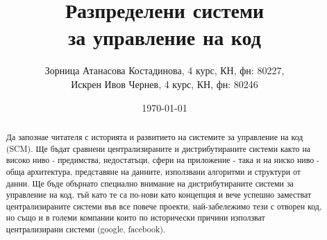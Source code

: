 \documentclass[a4paper]{article}
\begin{document}
\title{
Разпределени системи \\
за управление на код
}
\author{
Зорница Атанасова Костадинова, 4 курс, КН, фн: 80227, \\
Искрен Ивов Чернев, 4 курс, КН, фн: 80246
}
\date{\today}
\maketitle

\begin{abstract}
Да запознае читателя с историята и развитието на системите за управление на код
(SCM). Ще бъдат сравнени централизираните и дистрибутираните системи както на
високо ниво - предимства, недостатъци, сфери на приложение - така и на ниско
ниво - обща архитектура, представяне на данните, използвани алгоритми
и структури от данни. Ще бъде обърнато специално внимание на дистрибутираните
системи за управление на код, тъй като те са по-нови като концепция и вече
успешно заместват централизираните системи във все повече проекти,
най-забележимо тези с отворен код, но също и в големи компании които по
исторически причини използват централизирани системи (google, facebook).
\end{abstract}
\newpage

\setcounter{tocdepth}{2}
\tableofcontents
\newpage
\end{document}
